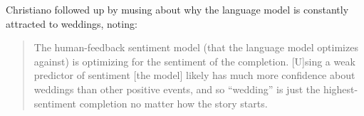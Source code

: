 Christiano followed up by musing about why the language model is constantly attracted to weddings, noting:

\begin{quote}
The human-feedback sentiment model (that the language model optimizes against) is optimizing for the sentiment of the completion. [U]sing a weak predictor of sentiment [the model] likely has much more confidence about weddings than other positive events, and so ``wedding'' is just the highest-sentiment completion no matter how the story starts.
\end{quote}
